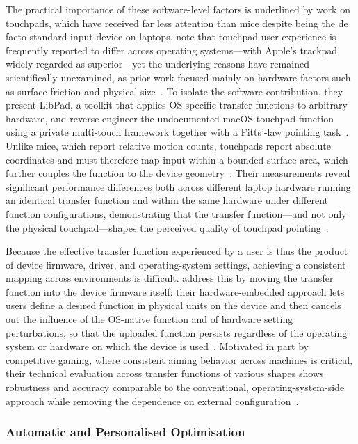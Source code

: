 The practical importance of these software-level factors is underlined by work on touchpads, which have received far less attention than mice despite being the de facto standard input device on laptops. \citeauthor{an2025libpad} note that touchpad user experience is frequently reported to differ across operating systems---with Apple's trackpad widely regarded as superior---yet the underlying reasons have remained scientifically unexamined, as prior work focused mainly on hardware factors such as surface friction and physical size~\cite{an2025libpad}. To isolate the software contribution, they present LibPad, a toolkit that applies OS-specific transfer functions to arbitrary hardware, and reverse engineer the undocumented macOS touchpad function using a private multi-touch framework together with a Fitts'-law pointing task~\cite{an2025libpad}. Unlike mice, which report relative motion counts, touchpads report absolute coordinates and must therefore map input within a bounded surface area, which further couples the function to the device geometry~\cite{an2025libpad}. Their measurements reveal significant performance differences both across different laptop hardware running an identical transfer function and within the same hardware under different function configurations, demonstrating that the transfer function---and not only the physical touchpad---shapes the perceived quality of touchpad pointing~\cite{an2025libpad}.

Because the effective transfer function experienced by a user is thus the product of device firmware, driver, and operating-system settings, achieving a consistent mapping across environments is difficult. \citeauthor{kim2025hardware} address this by moving the transfer function into the device firmware itself: their hardware-embedded approach lets users define a desired function in physical units on the device and then cancels out the influence of the OS-native function and of hardware setting perturbations, so that the uploaded function persists regardless of the operating system or hardware on which the device is used~\cite{kim2025hardware}. Motivated in part by competitive gaming, where consistent aiming behavior across machines is critical, their technical evaluation across transfer functions of various shapes shows robustness and accuracy comparable to the conventional, operating-system-side approach while removing the dependence on external configuration~\cite{kim2025hardware}.

\subsubsection{Automatic and Personalised Optimisation}

